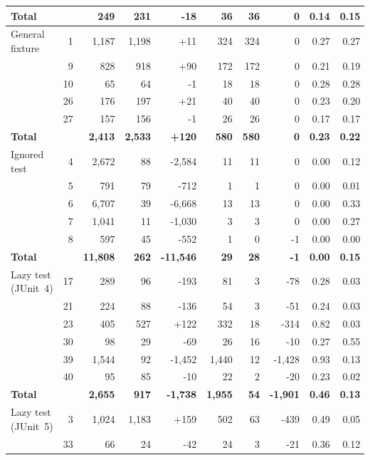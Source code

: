 \begin{xltabular}{\linewidth}{l r r r r r r r r r}
    \textbf{Total} & & \textbf{249} & \textbf{231} & \textbf{-18} & \textbf{36} & \textbf{36} & \textbf{0} & \textbf{0.14} & \textbf{0.15} \\
  \midrule
    General fixture & 1 & 1,187 & 1,198 & +11 & 324 & 324 & 0 & 0.27 & 0.27 \\
     & 9 & 828 & 918 & +90 & 172 & 172 & 0 & 0.21 & 0.19 \\
     & 10 & 65 & 64 & -1 & 18 & 18 & 0 & 0.28 & 0.28 \\
     & 26 & 176 & 197 & +21 & 40 & 40 & 0 & 0.23 & 0.20 \\
     & 27 & 157 & 156 & -1 & 26 & 26 & 0 & 0.17 & 0.17 \\
    \textbf{Total} & & \textbf{2,413} & \textbf{2,533} & \textbf{+120} & \textbf{580} & \textbf{580} & \textbf{0} & \textbf{0.23} & \textbf{0.22} \\
  \midrule
    Ignored test & 4 & 2,672 & 88 & -2,584 & 11 & 11 & 0 & 0.00 & 0.12 \\
     & 5 & 791 & 79 & -712 & 1 & 1 & 0 & 0.00 & 0.01 \\
     & 6 & 6,707 & 39 & -6,668 & 13 & 13 & 0 & 0.00 & 0.33 \\
     & 7 & 1,041 & 11 & -1,030 & 3 & 3 & 0 & 0.00 & 0.27 \\
     & 8 & 597 & 45 & -552 & 1 & 0 & -1 & 0.00 & 0.00 \\
    \textbf{Total} & & \textbf{11,808} & \textbf{262} & \textbf{-11,546} & \textbf{29} & \textbf{28} & \textbf{-1} & \textbf{0.00} & \textbf{0.15} \\
  \midrule
    Lazy test (JUnit~4) & 17 & 289 & 96 & -193 & 81 & 3 & -78 & 0.28 & 0.03 \\
     & 21 & 224 & 88 & -136 & 54 & 3 & -51 & 0.24 & 0.03 \\
     & 23 & 405 & 527 & +122 & 332 & 18 & -314 & 0.82 & 0.03 \\
     & 30 & 98 & 29 & -69 & 26 & 16 & -10 & 0.27 & 0.55 \\
     & 39 & 1,544 & 92 & -1,452 & 1,440 & 12 & -1,428 & 0.93 & 0.13 \\
     & 40 & 95 & 85 & -10 & 22 & 2 & -20 & 0.23 & 0.02 \\
    \textbf{Total} & & \textbf{2,655} & \textbf{917} & \textbf{-1,738} & \textbf{1,955} & \textbf{54} & \textbf{-1,901} & \textbf{0.46} & \textbf{0.13} \\
  \midrule
    Lazy test (JUnit~5) & 3 & 1,024 & 1,183 & +159 & 502 & 63 & -439 & 0.49 & 0.05 \\
     & 33 & 66 & 24 & -42 & 24 & 3 & -21 & 0.36 & 0.12 \\

\end{xltabular}
